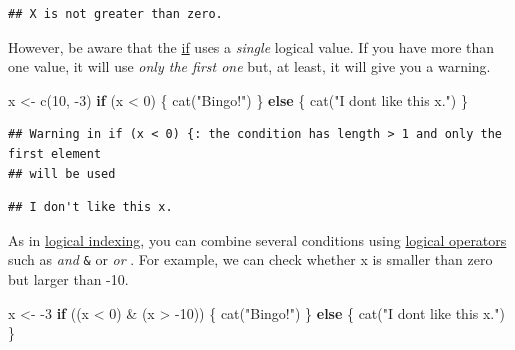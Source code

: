 \documentclass[
]{book}
\newenvironment{Shaded}{\begin{snugshade}}{\end{snugshade}}
\newcommand{\ControlFlowTok}[1]{\textcolor[rgb]{0.13,0.29,0.53}{\textbf{#1}}}
\newcommand{\DecValTok}[1]{\textcolor[rgb]{0.00,0.00,0.81}{#1}}
\newcommand{\FunctionTok}[1]{\textcolor[rgb]{0.00,0.00,0.00}{#1}}
\newcommand{\NormalTok}[1]{#1}
\newcommand{\OtherTok}[1]{\textcolor[rgb]{0.56,0.35,0.01}{#1}}
\newcommand{\SpecialCharTok}[1]{\textcolor[rgb]{0.00,0.00,0.00}{#1}}
\newcommand{\StringTok}[1]{\textcolor[rgb]{0.31,0.60,0.02}{#1}}
\begin{document}
\begin{verbatim}
## X is not greater than zero.
\end{verbatim}

However, be aware that the \href{https://stat.ethz.ch/R-manual/R-devel/library/base/html/Control.html}{if} uses a \emph{single} logical value. If you have more than one value, it will use \emph{only the first one} but, at least, it will give you a warning.

\begin{Shaded}
\begin{Highlighting}[]
\NormalTok{x }\OtherTok{\textless{}{-}} \FunctionTok{c}\NormalTok{(}\DecValTok{10}\NormalTok{,  }\SpecialCharTok{{-}}\DecValTok{3}\NormalTok{)}
\ControlFlowTok{if}\NormalTok{ (x }\SpecialCharTok{\textless{}} \DecValTok{0}\NormalTok{) \{}
  \FunctionTok{cat}\NormalTok{(}\StringTok{"Bingo!"}\NormalTok{)}
\NormalTok{\} }\ControlFlowTok{else}\NormalTok{ \{}
  \FunctionTok{cat}\NormalTok{(}\StringTok{"I don\textquotesingle{}t like this x."}\NormalTok{)}
\NormalTok{\}}
\end{Highlighting}
\end{Shaded}

\begin{verbatim}
## Warning in if (x < 0) {: the condition has length > 1 and only the first element
## will be used
\end{verbatim}

\begin{verbatim}
## I don't like this x.
\end{verbatim}

As in \protect\hyperlink{logical-indexing}{logical indexing}, you can combine several conditions using \href{https://stat.ethz.ch/R-manual/R-devel/library/base/html/Logic.html}{logical operators} such as \emph{and} \texttt{\&} or \emph{or} \texttt{\textbar{}}. For example, we can check whether x is smaller than zero but larger than -10.

\begin{Shaded}
\begin{Highlighting}[]
\NormalTok{x }\OtherTok{\textless{}{-}} \SpecialCharTok{{-}}\DecValTok{3}
\ControlFlowTok{if}\NormalTok{ ((x }\SpecialCharTok{\textless{}} \DecValTok{0}\NormalTok{) }\SpecialCharTok{\&}\NormalTok{ (x }\SpecialCharTok{\textgreater{}} \SpecialCharTok{{-}}\DecValTok{10}\NormalTok{)) \{}
  \FunctionTok{cat}\NormalTok{(}\StringTok{"Bingo!"}\NormalTok{)}
\NormalTok{\} }\ControlFlowTok{else}\NormalTok{ \{}
  \FunctionTok{cat}\NormalTok{(}\StringTok{"I don\textquotesingle{}t like this x."}\NormalTok{)}
\NormalTok{\}}
\end{Highlighting}
\end{Shaded}
\end{document}
